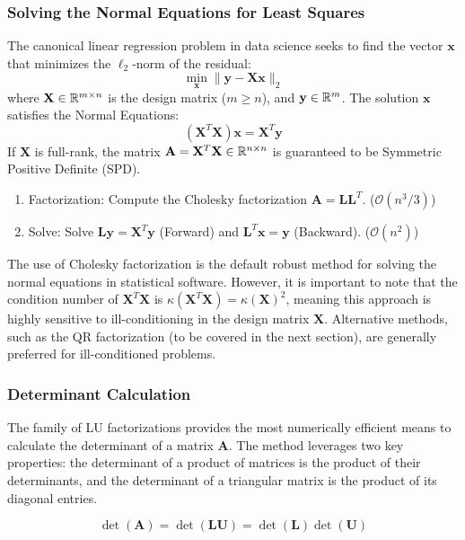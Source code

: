 \subsubsection{Solving the Normal Equations for Least Squares}

The canonical linear regression problem in data science seeks to find the vector $\mathbf{x}$ that minimizes the $\ell_2$-norm of the residual:
\[ \min_{\mathbf{x}} \|\mathbf{y} - \mathbf{X}\mathbf{x}\|_2 \]
where $\mathbf{X} \in \mathbb{R}^{m \times n}$ is the design matrix ($m \ge n$), and $\mathbf{y} \in \mathbb{R}^m$. The solution $\mathbf{x}$ satisfies the Normal Equations:
\[ (\mathbf{X}^T \mathbf{X}) \mathbf{x} = \mathbf{X}^T \mathbf{y} \]
If $\mathbf{X}$ is full-rank, the matrix $\mathbf{A} = \mathbf{X}^T \mathbf{X} \in \mathbb{R}^{n \times n}$ is guaranteed to be Symmetric Positive Definite (SPD).
\begin{enumerate}
    \item Factorization: Compute the Cholesky factorization $\mathbf{A} = \mathbf{L}\mathbf{L}^T$. ($\mathcal{O}(n^3/3)$)
    \item Solve: Solve $\mathbf{L}\mathbf{y} = \mathbf{X}^T \mathbf{y}$ (Forward) and $\mathbf{L}^T \mathbf{x} = \mathbf{y}$ (Backward). ($\mathcal{O}(n^2)$)
\end{enumerate}
The use of Cholesky factorization is the default robust method for solving the normal equations in statistical software. However, it is important to note that the condition number of $\mathbf{X}^T \mathbf{X}$ is $\kappa(\mathbf{X}^T \mathbf{X}) = \kappa(\mathbf{X})^2$, meaning this approach is highly sensitive to ill-conditioning in the design matrix $\mathbf{X}$. Alternative methods, such as the QR factorization (to be covered in the next section), are generally preferred for ill-conditioned problems.

\subsubsection{Determinant Calculation}

The family of LU factorizations provides the most numerically efficient means to calculate the determinant of a matrix $\mathbf{A}$. The method leverages two key properties: the determinant of a product of matrices is the product of their determinants, and the determinant of a triangular matrix is the product of its diagonal entries.

\[ \det(\mathbf{A}) = \det(\mathbf{L}\mathbf{U}) = \det(\mathbf{L})\det(\mathbf{U}) \]

